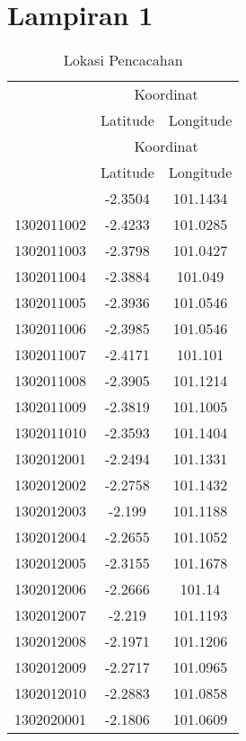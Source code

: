 \chapter*{Lampiran 1}


\begin{longtable}[h]{lcc}
	\caption{Lokasi Pencacahan}
	\label{tbl:enumeration_locations_full}\\
	\toprule
		& \multicolumn{2}{c}{Koordinat}\\
	\cmidrule{2-3}
		& Latitude & Longitude\\ 
	\midrule
	\endfirsthead
	\toprule
		& \multicolumn{2}{c}{Koordinat}\\
	\cmidrule{2-3}
		& Latitude & Longitude\\ 
	\midrule
	\endhead
	\bottomrule
	\endfoot
		1302011001 & -2.3504 & 101.1434\\ 
		1302011002 & -2.4233 & 101.0285\\ 
		1302011003 & -2.3798 & 101.0427\\ 
		1302011004 & -2.3884 & 101.049\\ 
		1302011005 & -2.3936 & 101.0546\\ 
		1302011006 & -2.3985 & 101.0546\\ 
		1302011007 & -2.4171 & 101.101\\ 
		1302011008 & -2.3905 & 101.1214\\ 
		1302011009 & -2.3819 & 101.1005\\ 
		1302011010 & -2.3593 & 101.1404\\ 
		1302012001 & -2.2494 & 101.1331\\ 
		1302012002 & -2.2758 & 101.1432\\ 
		1302012003 & -2.199 & 101.1188\\ 
		1302012004 & -2.2655 & 101.1052\\ 
		1302012005 & -2.3155 & 101.1678\\ 
		1302012006 & -2.2666 & 101.14\\ 
		1302012007 & -2.219 & 101.1193\\ 
		1302012008 & -2.1971 & 101.1206\\ 
		1302012009 & -2.2717 & 101.0965\\ 
		1302012010 & -2.2883 & 101.0858\\ 
		1302020001 & -2.1806 & 101.0609\\ 

\end{longtable}
